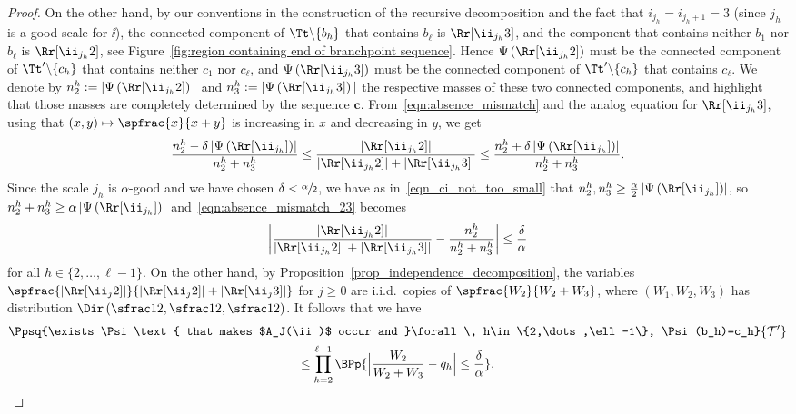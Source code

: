 \begin{proof}
On the other hand, by our conventions in the construction of the recursive decomposition and the fact that $i_{j_h}=i_{j_h+1}=3$ (since $j_h$ is a good scale for $\ii$), the connected component of $\Tt \backslash\{ b_h \}$ that contains $b_{\ell}$ is $\Rr[\ii_{j_h}3]$, and the component that contains neither $b_1$ nor $b_{\ell}$ is $\Rr[\ii_{j_h}2]$, see Figure~\ref{fig:region containing end of branchpoint sequence}.
Hence $\Psi \left( \Rr[\ii_{j_h}2] \right)$ must be the connected component of $\Tt' \backslash \{c_h\}$ that contains neither $c_1$ nor $c_{\ell}$, and $\Psi \left( \Rr[\ii_{j_h}3] \right)$ must be the connected component of $\Tt' \backslash \{c_h\}$ that contains $c_{\ell}$.
We denote by $n^h_2:=|\Psi \left( \Rr[\ii_{j_h}2] \right)|$ and $n^h_3:=|\Psi \left( \Rr[\ii_{j_h} 3] \right)|$ the respective masses of these two connected components, and highlight that those masses are completely determined by the sequence $\mathbf{c}$.
From~\eqref{eqn:absence_mismatch} and the analog equation for $\Rr[\ii_{j_h}3]$, using that $(x,y) \mapsto \spfrac{x}{x+y}$ is increasing in $x$ and decreasing in $y$, we get
\begin{equation}\label{eqn:absence_mismatch_23}
\frac{n^{h}_2 - \delta \left| \Psi \left( \Rr[\ii_{j_h}] \right) \right|}{n^{h}_2+n^{h}_3} \leq \frac{\left| \Rr[\ii_{j_h}2] \right|}{\left| \Rr[\ii_{j_h}2] \right|+\left| \Rr[\ii_{j_h}3] \right|} \leq \frac{n^{h}_2+\delta \left| \Psi \left( \Rr[\ii_{j_h}] \right) \right|}{n^{h}_2+n^{h}_3}.
\end{equation}
Since the scale $j_h$ is $\alpha$-good and we have chosen $\delta<\sfrac{\alpha}{2}$, we have as in~\eqref{eqn_ci_not_too_small} that $n^{h}_2, n^h_3 \geq \frac{\alpha}{2} \left| \Psi \left( \Rr[\ii_{j_h}] \right) \right|$, so $n_2^h+n_3^h \geq \alpha \left| \Psi \left( \Rr[\ii_{j_h}] \right) \right|$ and~\eqref{eqn:absence_mismatch_23} becomes
\[ \left| \frac{\left| \Rr[\ii_{j_h}2] \right|}{\left| \Rr[\ii_{j_h}2] \right|+\left| \Rr[\ii_{j_h}3] \right|}-\frac{n^{h}_2}{n^{h}_2+n^{h}_3} \right| \leq \frac{\delta}{\alpha} \]
for all $h\in\{2,\dots,\ell-1\}$. On the other hand, by Proposition~\ref{prop_independence_decomposition}, the variables $\spfrac{\left| \Rr[\ii_{j}2] \right|}{\left| \Rr[\ii_{j}2] \right|+\left| \Rr[\ii_{j}3] \right|}$ for $j \geq 0$ are i.i.d.\ copies of $\spfrac{W_2}{W_2+W_3}$, where $(W_1, W_2, W_3)$ has distribution $\Dir \left( \sfrac12, \sfrac12, \sfrac12 \right)$.
It follows that we have
\begin{multline*}
\Ppsq{\exists \Psi \text{ that makes $A_J(\ii)$ occur and }\forall \, h\in\{2,\dots,\ell-1\}, \Psi(b_h)=c_h}{ \mathcal{T'}} \\ \leq \prod_{h=2}^{\ell-1} \BPp{ \Bigl| \frac{W_2}{W_2+W_3}-q_h \Bigr| \leq \frac{\delta}{\alpha} },

\end{multline*}
\end{proof}
